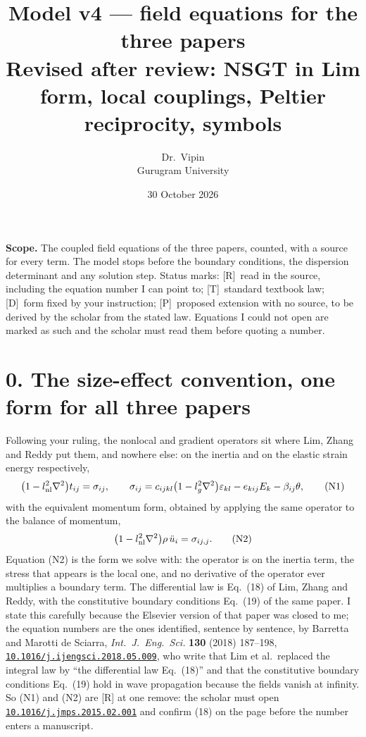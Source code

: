 \documentclass[11pt]{article}
\title{\vspace{-1.5cm}\textbf{Model v4 --- field equations for the three papers}\\[2pt]
\large Revised after review: NSGT in Lim form, local couplings, Peltier reciprocity, symbols}
\author{Dr.\ Vipin \\ Gurugram University}
\date{30 October 2026}
\newcommand{\doi}[1]{\href{https://doi.org/#1}{\texttt{#1}}}
\begin{document}
\maketitle
\vspace{-8mm}
\footnotesize
\noindent\textbf{Scope.} The coupled field equations of the three papers, counted, with a source for every
term. The model stops before the boundary conditions, the dispersion determinant and any solution step.
Status marks: [R]~read in the source, including the equation number I can point to; [T]~standard textbook
law; [D]~form fixed by your instruction; [P]~proposed extension with no source, to be derived by the
scholar from the stated law. Equations I could not open are marked as such and the scholar must read them
before quoting a number.

\section*{0. The size-effect convention, one form for all three papers}

Following your ruling, the nonlocal and gradient operators sit where Lim, Zhang and Reddy put them, and
nowhere else: on the inertia and on the elastic strain energy respectively,
\begin{equation}
\bigl(1-l_{\rm nl}^2\nabla^2\bigr)t_{ij}=\sigma_{ij},\qquad
\sigma_{ij}=c_{ijkl}\bigl(1-l_g^2\nabla^2\bigr)\varepsilon_{kl}
-e_{kij}E_k-\beta_{ij}\theta ,
\tag{N1}
\end{equation}
with the equivalent momentum form, obtained by applying the same operator to the balance of momentum,
\begin{equation}
\bigl(1-l_{\rm nl}^2\nabla^2\bigr)\rho\,\ddot u_i=\sigma_{ij,j}.
\tag{N2}
\end{equation}
Equation (N2) is the form we solve with: the operator is on the inertia term, the stress that appears is
the local one, and no derivative of the operator ever multiplies a boundary term. The differential law is
Eq.~(18) of Lim, Zhang and Reddy, with the constitutive boundary conditions Eq.~(19) of the same paper.
I state this carefully because the Elsevier version of that paper was closed to me; the equation numbers
are the ones identified, sentence by sentence, by Barretta and Marotti de Sciarra, \emph{Int.\ J.\ Eng.\
Sci.} \textbf{130} (2018) 187--198, \doi{10.1016/j.ijengsci.2018.05.009}, who write that Lim et al.\
replaced the integral law by ``the differential law Eq.~(18)'' and that the constitutive boundary
conditions Eq.~(19) hold in wave propagation because the fields vanish at infinity. So (N1) and (N2) are
[R] at one remove: the scholar must open \doi{10.1016/j.jmps.2015.02.001} and confirm (18) on the page
before the number enters a manuscript.
\end{document}
